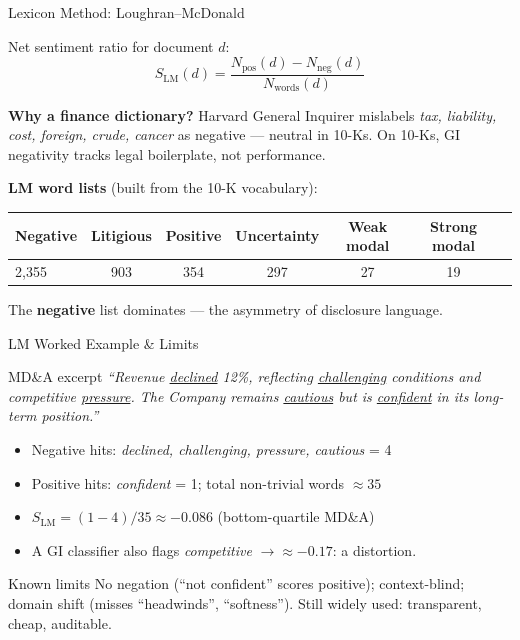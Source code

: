 \documentclass[9pt,t]{beamer}
\begin{document}
\begin{frame}{Lexicon Method: Loughran--McDonald}
\begin{underhood}
Net sentiment ratio for document $d$:
\[
S_{\text{LM}}(d) = \frac{N_{\text{pos}}(d) - N_{\text{neg}}(d)}{N_{\text{words}}(d)}
\]
\end{underhood}

\medskip
\textbf{Why a finance dictionary?} Harvard General Inquirer mislabels
\emph{tax, liability, cost, foreign, crude, cancer} as negative --- neutral in 10-Ks.
On 10-Ks, GI negativity tracks legal boilerplate, not performance.

\medskip
\textbf{LM word lists} (built from the 10-K vocabulary):
\begin{center}\small
\begin{tabular}{lcccccc}
\toprule
Negative & Litigious & Positive & Uncertainty & Weak modal & Strong modal \\
\midrule
2{,}355 & 903 & 354 & 297 & 27 & 19 \\
\bottomrule
\end{tabular}
\end{center}
The \textbf{negative} list dominates --- the asymmetry of disclosure language.
\end{frame}

\begin{frame}{LM Worked Example \& Limits}
\begin{exampleblock}{MD\&A excerpt}
\textit{``Revenue \underline{declined} 12\%, reflecting \underline{challenging}
conditions and competitive \underline{pressure}. The Company remains
\underline{cautious} but is \underline{confident} in its long-term position.''}
\end{exampleblock}
\begin{itemize}\small
  \item Negative hits: \emph{declined, challenging, pressure, cautious} = 4
  \item Positive hits: \emph{confident} = 1; \quad total non-trivial words $\approx 35$
  \item $S_{\text{LM}} = (1-4)/35 \approx \mathbf{-0.086}$ \quad (bottom-quartile MD\&A)
  \item A GI classifier also flags \emph{competitive} $\to \approx -0.17$: a distortion.
\end{itemize}

\medskip
\begin{alertblock}{Known limits}
No negation (``not confident'' scores positive); context-blind; domain shift
(misses ``headwinds'', ``softness''). Still widely used: transparent, cheap, auditable.
\end{alertblock}
\end{frame}
\end{document}

